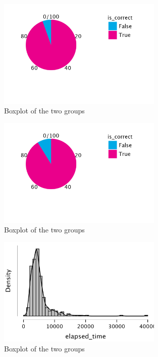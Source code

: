 \documentclass[unicode,11pt,a4paper,oneside,numbers=endperiod,openany]{scrartcl}
\begin{document}
\begin{figure}[h]
    \centering
    \includegraphics[width=0.7\textwidth]{./figures/correct_camel_noback.png}
    \caption{Boxplot of the two groups}
    \label{fig:boxplot}
\end{figure}

\begin{figure}[h]
    \centering
    \includegraphics[width=0.7\textwidth]{./figures/correct_keb_backgr.png}
    \caption{Boxplot of the two groups}
    \label{fig:boxplot}
\end{figure}

\begin{figure}[h]
    \centering
    \includegraphics[width=0.7\textwidth]{./figures/correct_kebab_distr.png}
    \caption{Boxplot of the two groups}
    \label{fig:boxplot}
\end{figure}
\end{document}
